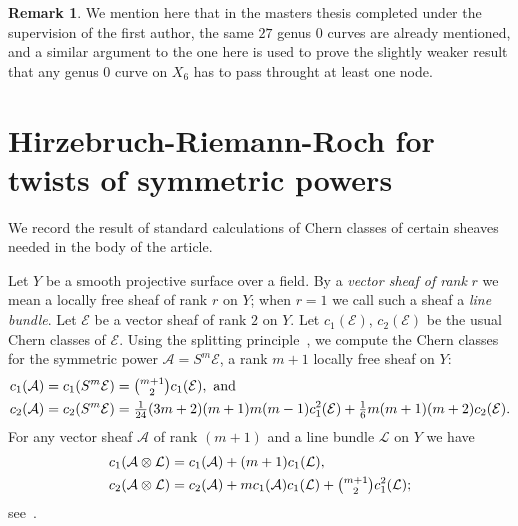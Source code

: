 \documentclass[12pt, reqno]{amsart}
\theoremstyle{definition}
\newtheorem{remark}[lemma]{Remark}
\newcommand{\calA}{{\mathcal A}}
\newcommand{\calE}{{\mathcal E}}
\newcommand{\calL}{{\mathcal L}}
\numberwithin{equation}{section}
\numberwithin{table}{section}
\newcommand{\defi}[1]{\emph{#1}} %
\begin{document}
\begin{remark} We mention here that in the masters thesis \cite{alaei2015} completed under the supervision of the first author, the same $27$ genus $0$ curves are already mentioned, and a similar argument to the one here is used to prove the slightly weaker result that any genus $0$ curve on $X_6$ has to pass throught at least one node.
\end{remark}


\appendix
\section{Hirzebruch-Riemann-Roch for twists of symmetric powers}
\label{sec:Chern}

We record the result of standard calculations of Chern classes of certain sheaves needed in the body of the article.

Let $Y$ be a smooth projective surface over a field. By a \defi{vector sheaf of rank} $r$ we mean a locally free sheaf of rank $r$ on $Y$; when $r = 1$ we call such a sheaf a \defi{line bundle}. Let $\calE$ be a vector sheaf of rank $2$ on $Y$.  Let $c_1(\calE)$, $c_2(\calE)$ be the usual Chern classes of $\calE$.  Using the splitting principle~\cite[Remark~3.2.3]{Fulton}, we compute the Chern classes for the symmetric power $\calA=S^m\calE$, a rank $m+1$ locally free sheaf on $Y$:
\begin{equation}
\label{eq:ChernClassesSm}
\begin{split}
	c_1(\calA)=c_1(S^m\calE) 	&= \tbinom{m+1}{2}c_1(\calE), \text{ and}\\
	c_2(\calA)=c_2(S^m\calE)	&= \tfrac{1}{24}(3m + 2)(m + 1)m(m-1)c_1^2(\calE) + \tfrac{1}{6}m(m+1)(m+2)c_2(\calE).
\end{split}
\end{equation}
For any vector sheaf $\calA$ of rank $(m+1)$ and a line bundle $\calL$ on $Y$ we have
\begin{equation}
\label{eq:ChernClassesProd}
\begin{split}
	c_1(\calA\otimes\calL) 	&= c_1(\calA) + (m+1)c_1(\calL), \\
	c_2(\calA\otimes\calL) 	&= c_2(\calA) + m c_1(\calA)c_1(\calL) + \tbinom{m+1}{2}c_1^2(\calL);
\end{split}
\end{equation}
see~\cite[p.~55]{Fulton}. 
\end{document}
